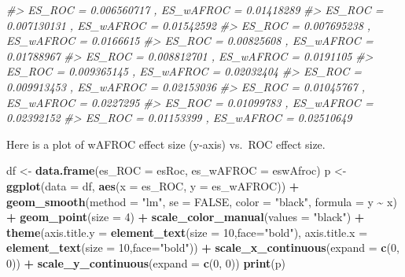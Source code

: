 \documentclass[
]{book}
\newenvironment{Shaded}{\begin{snugshade}}{\end{snugshade}}
\newcommand{\CommentTok}[1]{\textcolor[rgb]{0.56,0.35,0.01}{\textit{#1}}}
\newcommand{\DataTypeTok}[1]{\textcolor[rgb]{0.13,0.29,0.53}{#1}}
\newcommand{\DecValTok}[1]{\textcolor[rgb]{0.00,0.00,0.81}{#1}}
\newcommand{\KeywordTok}[1]{\textcolor[rgb]{0.13,0.29,0.53}{\textbf{#1}}}
\newcommand{\NormalTok}[1]{#1}
\newcommand{\OperatorTok}[1]{\textcolor[rgb]{0.81,0.36,0.00}{\textbf{#1}}}
\newcommand{\OtherTok}[1]{\textcolor[rgb]{0.56,0.35,0.01}{#1}}
\newcommand{\StringTok}[1]{\textcolor[rgb]{0.31,0.60,0.02}{#1}}
\begin{document}
\begin{Shaded}
\begin{Highlighting}[]
\CommentTok{\#\textgreater{} ES\_ROC =  0.006560717 , ES\_wAFROC =  0.01418289 }
\CommentTok{\#\textgreater{} ES\_ROC =  0.007130131 , ES\_wAFROC =  0.01542592 }
\CommentTok{\#\textgreater{} ES\_ROC =  0.007695238 , ES\_wAFROC =  0.0166615 }
\CommentTok{\#\textgreater{} ES\_ROC =  0.00825608 , ES\_wAFROC =  0.01788967 }
\CommentTok{\#\textgreater{} ES\_ROC =  0.008812701 , ES\_wAFROC =  0.0191105 }
\CommentTok{\#\textgreater{} ES\_ROC =  0.009365145 , ES\_wAFROC =  0.02032404 }
\CommentTok{\#\textgreater{} ES\_ROC =  0.009913453 , ES\_wAFROC =  0.02153036 }
\CommentTok{\#\textgreater{} ES\_ROC =  0.01045767 , ES\_wAFROC =  0.0227295 }
\CommentTok{\#\textgreater{} ES\_ROC =  0.01099783 , ES\_wAFROC =  0.02392152 }
\CommentTok{\#\textgreater{} ES\_ROC =  0.01153399 , ES\_wAFROC =  0.02510649}
\end{Highlighting}
\end{Shaded}

Here is a plot of wAFROC effect size (y-axis) vs.~ROC effect size.

\begin{Shaded}
\begin{Highlighting}[]
\NormalTok{df \textless{}{-}}\StringTok{ }\KeywordTok{data.frame}\NormalTok{(}\DataTypeTok{es\_ROC =}\NormalTok{ esRoc, }\DataTypeTok{es\_wAFROC =}\NormalTok{ eswAfroc)}
\NormalTok{p \textless{}{-}}\StringTok{ }\KeywordTok{ggplot}\NormalTok{(}\DataTypeTok{data =}\NormalTok{ df, }\KeywordTok{aes}\NormalTok{(}\DataTypeTok{x =}\NormalTok{ es\_ROC, }\DataTypeTok{y =}\NormalTok{ es\_wAFROC)) }\OperatorTok{+}
\StringTok{  }\KeywordTok{geom\_smooth}\NormalTok{(}\DataTypeTok{method =} \StringTok{"lm"}\NormalTok{, }\DataTypeTok{se =} \OtherTok{FALSE}\NormalTok{, }\DataTypeTok{color =} \StringTok{"black"}\NormalTok{, }\DataTypeTok{formula =}\NormalTok{ y }\OperatorTok{\textasciitilde{}}\StringTok{ }\NormalTok{x) }\OperatorTok{+}
\StringTok{  }\KeywordTok{geom\_point}\NormalTok{(}\DataTypeTok{size =} \DecValTok{4}\NormalTok{) }\OperatorTok{+}
\StringTok{  }\KeywordTok{scale\_color\_manual}\NormalTok{(}\DataTypeTok{values =} \StringTok{"black"}\NormalTok{) }\OperatorTok{+}\StringTok{ }
\StringTok{  }\KeywordTok{theme}\NormalTok{(}\DataTypeTok{axis.title.y =} \KeywordTok{element\_text}\NormalTok{(}\DataTypeTok{size =} \DecValTok{10}\NormalTok{,}\DataTypeTok{face=}\StringTok{"bold"}\NormalTok{),}
        \DataTypeTok{axis.title.x =} \KeywordTok{element\_text}\NormalTok{(}\DataTypeTok{size =} \DecValTok{10}\NormalTok{,}\DataTypeTok{face=}\StringTok{"bold"}\NormalTok{)) }\OperatorTok{+}
\StringTok{  }\KeywordTok{scale\_x\_continuous}\NormalTok{(}\DataTypeTok{expand =} \KeywordTok{c}\NormalTok{(}\DecValTok{0}\NormalTok{, }\DecValTok{0}\NormalTok{)) }\OperatorTok{+}\StringTok{ }
\StringTok{  }\KeywordTok{scale\_y\_continuous}\NormalTok{(}\DataTypeTok{expand =} \KeywordTok{c}\NormalTok{(}\DecValTok{0}\NormalTok{, }\DecValTok{0}\NormalTok{)) }
\KeywordTok{print}\NormalTok{(p)}
\end{Highlighting}
\end{Shaded}
\end{document}
